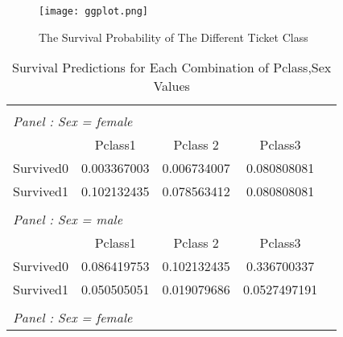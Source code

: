 \documentclass[12pt,english]{article}
\begin{document}
\begin{figure}[H]
\centering
\texttt{[image: ggplot.png]}
\caption{The Survival Probability of The Different Ticket Class}
\label{Fig.The Survival Probability of The Different Ticket Class}
\end{figure}


\begin{table}[ht]
\caption{Survival Predictions for Each Combination of Pclass,Sex Values}
\label{tab:descriptives} 
\centering
\begin{threeparttable}
\begin{tabular}{lcccc}
&&&&\\
\multicolumn{5}{l}{\emph{Panel : Sex = female}}\\

\toprule
                                                        &Pclass1 & Pclass 2 & Pclass3\\ 
\midrule
Survived0                                               &0.003367003& 0.006734007& 0.080808081\\
Survived1                                               &0.102132435& 0.078563412&0.080808081\\
&&&&\\



\multicolumn{5}{l}{\emph{Panel : Sex = male}}\\

\toprule
                                                         &Pclass1 & Pclass 2 & Pclass3\\ 
\midrule
Survived0                                                &0.086419753& 0.102132435& 0.336700337\\
Survived1                                                & 0.050505051& 0.019079686 &0.0527497191\\
&&&&\\


\multicolumn{5}{l}{\emph{Panel : Sex = female}}\\


\end{tabular}
\end{threeparttable}
\end{table}
\end{document}
